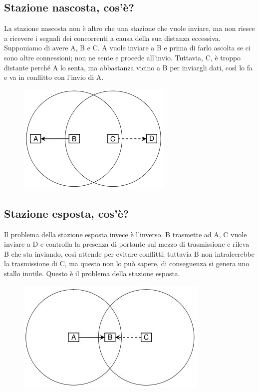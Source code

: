 \subsection{Stazione nascosta, cos'è?}
La stazione nascosta non è altro che una stazione che vuole inviare, ma non riesce a ricevere i segnali dei concorrenti a causa della sua distanza eccessiva. Supponiamo di avere A, B e C. A vuole inviare a B e prima di farlo ascolta se ci sono altre connessioni; non ne sente e procede all’invio. Tuttavia, C, è troppo distante perché A lo senta, ma abbastanza vicino a B per inviargli dati, così lo fa e va in conflitto con l’invio di A.

\begin{figure}[H]
\centering
\includegraphics[scale=0.6]{res/img/30_StazioneEsposta.png}
\end{figure} 

\subsection{Stazione esposta, cos'è?}

Il problema della stazione esposta invece è l’inverso. B trasmette ad A, C vuole inviare a D e controlla la presenza di portante sul mezzo di trasmissione e rileva B che sta inviando, così attende per evitare conflitti; tuttavia B non intralcerebbe la trasmissione di C, ma questo non lo può sapere, di conseguenza si genera uno stallo inutile. Questo è il problema della stazione esposta.
 
 \begin{figure}[H]
\centering
\includegraphics[scale=0.6]{res/img/30_StazioneNascosta.png}
\end{figure} 